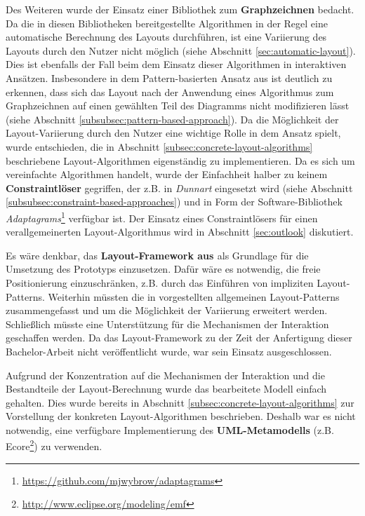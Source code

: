 Des Weiteren wurde der Einsatz einer Bibliothek zum \textbf{Graphzeichnen} bedacht. Da die in diesen Bibliotheken bereitgestellte Algorithmen in der Regel eine automatische Berechnung des Layouts durchführen, ist eine Variierung des Layouts durch den Nutzer nicht möglich (siehe Abschnitt \ref{sec:automatic-layout}). Dies ist ebenfalls der Fall beim dem Einsatz dieser Algorithmen in interaktiven Ansätzen. Insbesondere in dem Pattern-basierten Ansatz aus \cite{Maier12A-Pattern-based} ist deutlich zu erkennen, dass sich das Layout nach der Anwendung eines Algorithmus zum Graphzeichnen auf einen gewählten Teil des Diagramms nicht modifizieren lässt (siehe Abschnitt \ref{subsubsec:pattern-based-approach}). Da die Möglichkeit der Layout-Variierung durch den Nutzer eine wichtige Rolle in dem Ansatz spielt, wurde entschieden, die in Abschnitt \ref{subsec:concrete-layout-algorithms} beschriebene Layout-Algorithmen eigenständig zu implementieren. Da es sich um vereinfachte Algorithmen handelt, wurde der Einfachheit halber zu keinem \textbf{Constraintlöser} gegriffen, der z.B. in \textit{Dunnart} eingesetzt wird (siehe Abschnitt \ref{subsubsec:constraint-based-approaches}) und in Form der Software-Bibliothek \textit{Adaptagrams}\footnote{\url{https://github.com/mjwybrow/adaptagrams}} verfügbar ist. Der Einsatz eines Constraintlösers für einen verallgemeinerten Layout-Algorithmus wird in Abschnitt \ref{sec:outlook} diskutiert.

Es wäre denkbar, das \textbf{Layout-Framework aus \cite{Maier12A-Pattern-based}} als Grundlage für die Umsetzung des Prototyps einzusetzen. Dafür wäre es notwendig, die freie Positionierung einzuschränken, z.B. durch das Einführen von impliziten Layout-Patterns. Weiterhin müssten die in \cite{Maier12A-Pattern-based} vorgestellten allgemeinen Layout-Patterns zusammengefasst und um die Möglichkeit der Variierung erweitert werden. Schließlich müsste eine Unterstützung für die Mechanismen der Interaktion geschaffen werden. Da das Layout-Framework zu der Zeit der Anfertigung dieser Bachelor-Arbeit nicht veröffentlicht wurde, war sein Einsatz ausgeschlossen.

Aufgrund der Konzentration auf die Mechanismen der Interaktion und die Bestandteile der Layout-Berechnung wurde das bearbeitete Modell einfach gehalten. Dies wurde bereits in Abschnitt \ref{subsec:concrete-layout-algorithms} zur Vorstellung der konkreten Layout-Algorithmen beschrieben. Deshalb war es nicht notwendig, eine verfügbare Implementierung des \textbf{UML-Metamodells} (z.B. Ecore\footnote{\url{http://www.eclipse.org/modeling/emf}}) zu verwenden.

